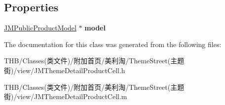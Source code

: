 \subsection*{Properties}
\begin{DoxyCompactItemize}
\item 
\mbox{\label{interface_j_m_theme_detail_product_cell_a89cb617241ac4c4db135cf2417355003}} 
\mbox{\hyperlink{interface_j_m_public_product_model}{J\+M\+Public\+Product\+Model}} $\ast$ {\bfseries model}
\end{DoxyCompactItemize}


The documentation for this class was generated from the following files\+:\begin{DoxyCompactItemize}
\item 
T\+H\+B/\+Classes(类文件)/附加首页/美利淘/\+Theme\+Street(主题街)/view/J\+M\+Theme\+Detail\+Product\+Cell.\+h\item 
T\+H\+B/\+Classes(类文件)/附加首页/美利淘/\+Theme\+Street(主题街)/view/J\+M\+Theme\+Detail\+Product\+Cell.\+m\end{DoxyCompactItemize}
